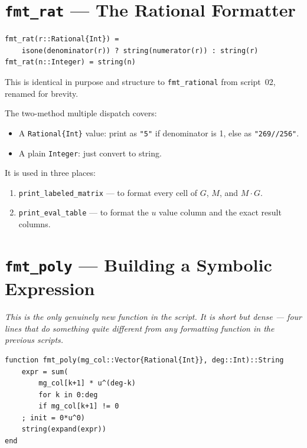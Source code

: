 \documentclass[12pt, a4paper]{article}
\newcommand{\cd}[1]{\texttt{#1}}
\begin{document}
\section{\texttt{fmt\_rat} --- The Rational Formatter}

\begin{verbatim}
fmt_rat(r::Rational{Int}) =
    isone(denominator(r)) ? string(numerator(r)) : string(r)
fmt_rat(n::Integer) = string(n)
\end{verbatim}

This is identical in purpose and structure to
\cd{fmt\_rational} from script~02, renamed for brevity.

The two-method multiple dispatch covers:
\begin{itemize}
  \item A \cd{Rational\{Int\}} value: print as \cd{"5"} if
        denominator is 1, else as \cd{"269//256"}.
  \item A plain \cd{Integer}: just convert to string.
\end{itemize}

It is used in three places:
\begin{enumerate}
  \item \cd{print\_labeled\_matrix} --- to format every cell
        of $G$, $M$, and $M \cdot G$.
  \item \cd{print\_eval\_table} --- to format the $u$ value
        column and the exact result columns.
\end{enumerate}


\section{\texttt{fmt\_poly} --- Building a Symbolic Expression}

\textit{This is the only genuinely new function in the script.
It is short but dense --- four lines that do something
quite different from any formatting function in the
previous scripts.}

\begin{verbatim}
function fmt_poly(mg_col::Vector{Rational{Int}}, deg::Int)::String
    expr = sum(
        mg_col[k+1] * u^(deg-k)
        for k in 0:deg
        if mg_col[k+1] != 0
    ; init = 0*u^0)
    string(expand(expr))
end
\end{verbatim}
\end{document}
